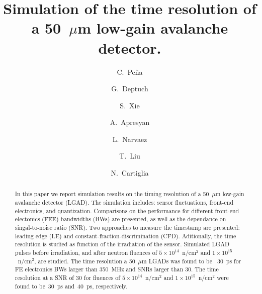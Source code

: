 \documentclass[preprint,1p]{elsarticle}
\begin{document}
\linenumbers

\begin{frontmatter}



\title{Simulation of the time resolution of a 50~$\mu$m low-gain avalanche detector.}


\author[1,2]{C.~Pe\~na}
\author[1]{G.~Deptuch}
\author[2]{S.~Xie}
\author[1]{A.~Apresyan}
\author[2]{L.~Narvaez}
\author[1]{T.~Liu}
\author[3]{N.~Cartiglia}


\address[1]{Fermi National Accelerator Laboratory, Batavia, IL, USA}
\address[2]{California Institute of Technology, Pasadena, CA, USA}
\address[3]{INFN, Torino, Italy}

\begin{abstract}
In this paper we report simulation results on the timing resolution of a 50~$\mu$m low-gain avalanche detector (LGAD).
The simulation includes: sensor fluctuations, front-end electronics, and quantization.
Comparisons on the performance for different front-end electonics (FEE) bandwidths (BWs) are presented, as well as
the dependance on singal-to-noise ratio (SNR).
Two approaches to measure the timestamp are presented: leading edge (LE) and constant-fraction-discrimination (CFD).
Aditionally, the time resolution is studied as function of the irradiation of the sensor.
Simulated LGAD pulses before irradiation, and after neutron fluences of
 $5\times 10^{14}$~n/cm$^2$ and $1\times 10^{15}$~n/cm$^2$, are studied.
 The time resolution a 50~$\mu$m LGADs was found to be ~30~ps for FE electronics BWs larger than 350~MHz and SNRs larger than 30.
 The time resolution at a SNR of 30 for fluences of $5\times 10^{14}$~n/cm$^2$ and $1\times 10^{15}$~n/cm$^2$ were found to be~30~\si{ps}
  and~40~\si{ps}, respectively.
\end{abstract}


\end{frontmatter}
\end{document}
